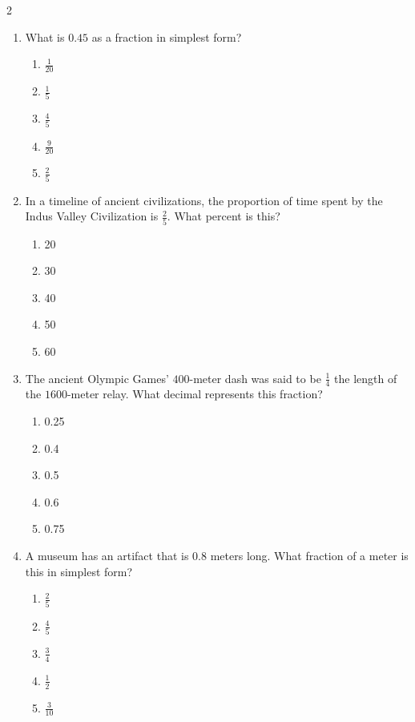 \documentclass[10pt]{article}
\begin{document}
\begin{multicols}{2}
\begin{enumerate}[label=\textbf{Q\arabic*.}, leftmargin=*, itemsep=6pt, parsep=0pt]
  \item \small What is $0.45$ as a fraction in simplest form?
  \begin{enumerate}[label=(\Alph*), leftmargin=0.6cm, nosep, itemsep=2pt]
    \item $\frac{1}{20}$
    \item $\frac{1}{5}$
    \item $\frac{4}{5}$
    \item $\frac{9}{20}$
    \item $\frac{2}{5}$
  \end{enumerate}

  \item \small In a timeline of ancient civilizations, the proportion of time spent by the Indus Valley Civilization is $\frac{2}{5}$. What percent is this?
  \begin{enumerate}[label=(\Alph*), leftmargin=0.6cm, nosep, itemsep=2pt]
    \item 20%
    \item 30%
    \item 40%
    \item 50%
    \item 60%
  \end{enumerate}

  \item \small The ancient Olympic Games' $400$-meter dash was said to be $\frac{1}{4}$ the length of the $1600$-meter relay. What decimal represents this fraction?
  \begin{enumerate}[label=(\Alph*), leftmargin=0.6cm, nosep, itemsep=2pt]
    \item 0.25
    \item 0.4
    \item 0.5
    \item 0.6
    \item 0.75
  \end{enumerate}

  \item \small A museum has an artifact that is $0.8$ meters long. What fraction of a meter is this in simplest form?
  \begin{enumerate}[label=(\Alph*), leftmargin=0.6cm, nosep, itemsep=2pt]
    \item $\frac{2}{5}$
    \item $\frac{4}{5}$
    \item $\frac{3}{4}$
    \item $\frac{1}{2}$
    \item $\frac{3}{10}$
  \end{enumerate}


\end{enumerate}
\end{multicols}
\end{document}
